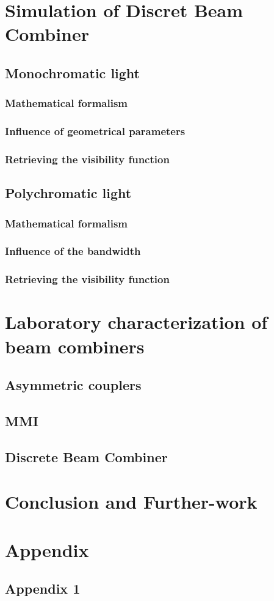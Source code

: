 \documentclass[a4paper,twoside,11pt]{article}
\makeatletter
\newcommand\backmatter{%
  \if@openright
    \clearpage
  \else
    \clearpage
  \fi
   }
\makeatother
\begin{document}
\section{Simulation of Discret Beam Combiner}
    \subsection{Monochromatic light}
        \subsubsection{Mathematical formalism}
        \subsubsection{Influence of geometrical parameters}
        \subsubsection{Retrieving the visibility function}
    \subsection{Polychromatic light}
        \subsubsection{Mathematical formalism}
        \subsubsection{Influence of the bandwidth}
        \subsubsection{Retrieving the visibility function}
        
\section{Laboratory characterization of beam combiners}
    \subsection{Asymmetric couplers}
    \subsection{MMI}
    \subsection{Discrete Beam Combiner}

\section{Conclusion and Further-work}

\backmatter
\appendix
\section{Appendix}
    \subsection{Appendix 1}
\end{document}
